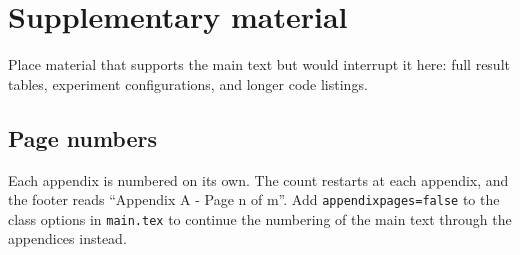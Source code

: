 \chapter{Supplementary material}
Place material that supports the main text but would interrupt it here: full result tables, experiment configurations, and longer code listings.

\section{Page numbers}
Each appendix is numbered on its own. The count restarts at each appendix, and the footer reads ``Appendix A - Page n of m''. Add \texttt{appendixpages=false} to the class options in \texttt{main.tex} to continue the numbering of the main text through the appendices instead.
